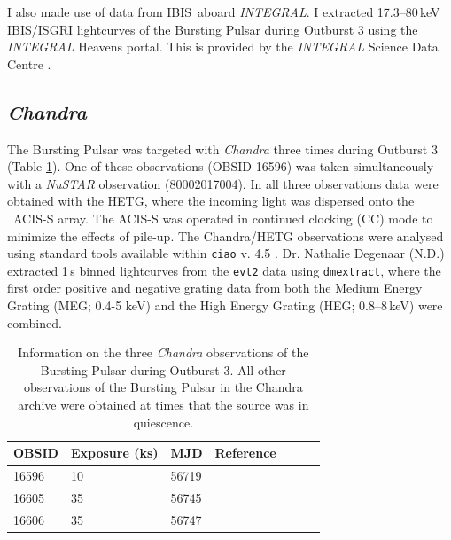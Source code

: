 \par I also made use of data from IBIS\indexibis\ aboard \textit{INTEGRAL}\indexintegral.  I extracted 17.3--80\,keV IBIS/ISGRI lightcurves of the Bursting Pulsar during Outburst 3 using the \textit{INTEGRAL} Heavens portal.  This is provided by the \textit{INTEGRAL} Science Data Centre \citep{Lubinski_Heavens}.

\subsection{\textit{Chandra}}

\par The Bursting Pulsar was targeted with \indexchandra\textit{Chandra} three times during Outburst 3 (Table \ref{tab:ChandraBP}).  One of these observations (OBSID 16596) was taken simultaneously with a \indexnustar\textit{NuSTAR} observation (80002017004).  In all three observations data were obtained with the HETG, where the incoming light was dispersed onto the \indexacis\ ACIS-S array. The ACIS-S was operated in continued clocking (CC) mode to minimize the effects of pile-up. The Chandra/HETG observations were analysed using standard tools available within \texttt{ciao} v. 4.5 \citep{Fruscione_Ciao}. Dr. Nathalie Degenaar (\textsf{N.D.}) extracted 1\,s binned lightcurves from the \texttt{evt2} data using \texttt{dmextract}, where the first order positive and negative grating data from both the Medium Energy Grating (MEG; 0.4-5 keV) and the High Energy Grating (HEG; 0.8--8\,keV) were combined.

\begin{table}
\centering
\begin{tabular}{lllllll}
\hline
\hline
\scriptsize  OBSID &\scriptsize Exposure (ks) &\scriptsize MJD &\scriptsize Reference \\
\hline
16596  	& 10 &  56719      &   \citet{Younes_Expo} \\
16605  	& 35 &   56745    &    \citet{Degenaar_BPSpec}\\
16606  	& 35 &   56747    &    \citet{Degenaar_BPSpec}\\
\hline
\hline
\end{tabular}
\caption[Information on the three \textit{Chandra} observations of the Bursting Pulsar during its 2014 outburst.]{Information on the three \indexchandra\textit{Chandra} observations of the Bursting Pulsar during Outburst 3.  All other observations of the Bursting Pulsar in the Chandra archive were obtained at times that the source was in quiescence.}
\label{tab:ChandraBP}
\end{table}

